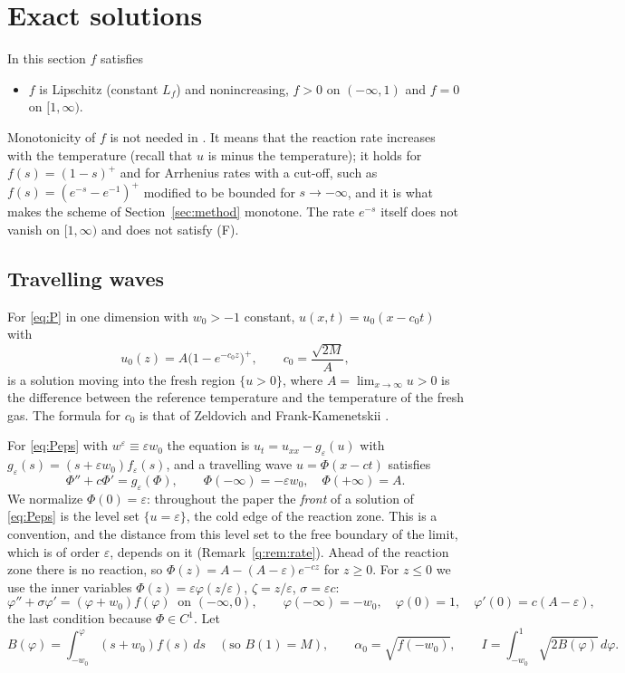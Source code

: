 \documentclass[11pt]{amsart}
\theoremstyle{definition}
\theoremstyle{remark}
\newcommand{\ve}{\varepsilon}
\begin{document}
\section{Exact solutions}\label{sec:exact}

In this section $f$ satisfies
\begin{itemize}
\item[(F)] $f$ is Lipschitz (constant $L_f$) and nonincreasing, $f>0$ on $(-\infty,1)$ and
$f=0$ on $[1,\infty)$.
\end{itemize}
Monotonicity of $f$ is not needed in \cite{FernandezBonderWolanski2000}. It means that
the reaction rate increases with the temperature (recall that $u$ is minus the
temperature); it holds for $f(s)=(1-s)^+$ and for Arrhenius rates with a cut-off, such
as $f(s)=(e^{-s}-e^{-1})^+$ modified to be bounded for $s\to-\infty$, and it is what
makes the scheme of Section~\ref{sec:method} monotone. The rate $e^{-s}$ itself does not
vanish on $[1,\infty)$ and does not satisfy (F).

\subsection{Travelling waves}\label{sec:tw}
For \eqref{eq:P} in one dimension with $w_0>-1$ constant,
$u(x,t)=u_0(x-c_0t)$ with
\[
u_0(z)=A\big(1-e^{-c_0z}\big)^+,\qquad c_0=\frac{\sqrt{2M}}A ,
\]
is a solution moving into the fresh region $\{u>0\}$, where $A=\lim_{x\to\infty}u>0$ is
the difference between the reference temperature and the temperature of the fresh gas.
The formula for $c_0$ is that of Zeldovich and Frank-Kamenetskii
\cite{ZeldovichFrankKamenetskii1938}.

For \eqref{eq:Peps} with $w^\ve\equiv\ve w_0$ the equation is
$u_t=u_{xx}-g_\ve(u)$ with $g_\ve(s)=(s+\ve w_0)f_\ve(s)$, and a travelling wave
$u=\Phi(x-ct)$ satisfies
\begin{equation}\label{an:eq:tw}
\Phi''+c\Phi'=g_\ve(\Phi),\qquad \Phi(-\infty)=-\ve w_0,\quad\Phi(+\infty)=A .
\end{equation}
We normalize $\Phi(0)=\ve$: throughout the paper the \emph{front} of a solution of
\eqref{eq:Peps} is the level set $\{u=\ve\}$, the cold edge of the reaction zone. This is
a convention, and the distance from this level set to the free boundary of the limit,
which is of order $\ve$, depends on it (Remark~\ref{q:rem:rate}). Ahead of the reaction
zone there is no reaction,
so $\Phi(z)=A-(A-\ve)e^{-cz}$ for $z\ge0$. For $z\le0$ we use the inner variables
$\Phi(z)=\ve\varphi(z/\ve)$, $\zeta=z/\ve$, $\sigma=\ve c$:
\begin{equation}\label{eq:tw}
\varphi''+\sigma\varphi'=(\varphi+w_0)f(\varphi)\ \text{ on }(-\infty,0),\qquad
\varphi(-\infty)=-w_0,\quad\varphi(0)=1,\quad \varphi'(0)=c(A-\ve),
\end{equation}
the last condition because $\Phi\in C^1$. Let
\[
B(\varphi)=\int_{-w_0}^{\varphi}(s+w_0)f(s)\,ds\quad(\text{so }B(1)=M),\qquad
\alpha_0=\sqrt{f(-w_0)},\qquad I=\int_{-w_0}^1\sqrt{2B(\varphi)}\,d\varphi .
\]
\end{document}
